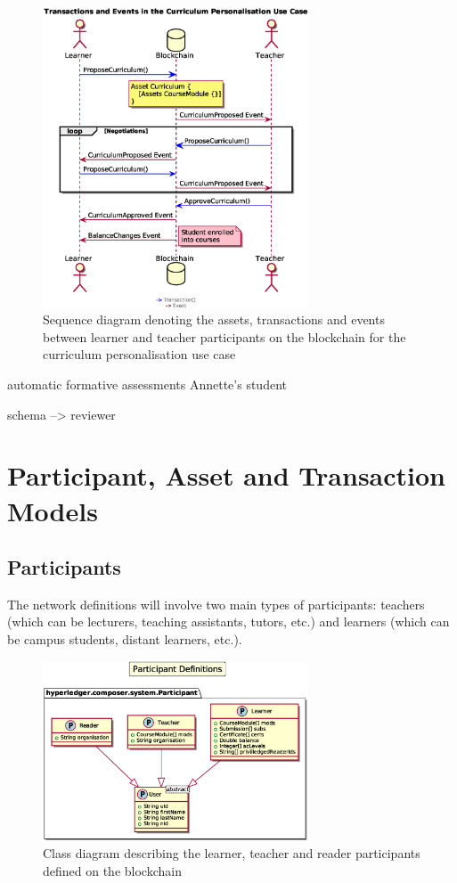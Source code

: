 \begin{figure}[!ht] 
    \centering    
    \includegraphics[width=0.7\textwidth]{personalisationloop}
    \caption[Curriculum Personalisation Use Case]
        {Sequence diagram denoting the assets, transactions and events between 
         learner and teacher participants on the blockchain for the curriculum personalisation use case} 
    \label{fig:personalisationloop}
\end{figure}

automatic formative assessments Annette's student

schema --> reviewer

\section{Participant, Asset and Transaction Models}

\subsection{Participants}

The network definitions will involve two main types of participants: teachers (which can be lecturers, 
teaching assistants, tutors, etc.) and learners (which can be campus students, distant learners, etc.).

\begin{figure}[!ht] 
    \centering    
    \includegraphics[width=0.7\textwidth]{participants}
    \caption[Participants Class Diagram]
        {Class diagram describing the learner, teacher and reader participants defined on the blockchain} 
    \label{fig:participants}
\end{figure}

